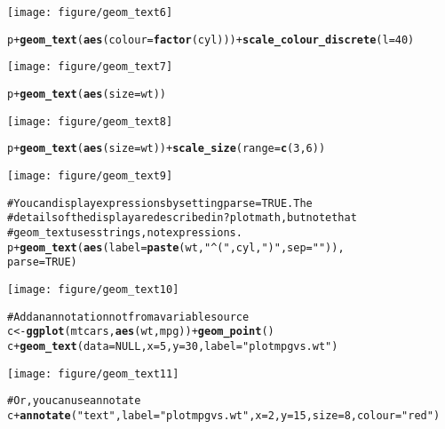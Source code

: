\documentclass[a4paper,titlepage]{tufte-handout}\usepackage{graphicx, color}
\makeatletter
\def\maxwidth{ %
  \ifdim\Gin@nat@width>\linewidth
    \linewidth
  \else
    \Gin@nat@width
  \fi
}
\newcommand{\hlfunctioncall}[1]{\textcolor[rgb]{0.501960784313725,0,0.329411764705882}{\textbf{#1}}}%
\newcommand{\hlstring}[1]{\textcolor[rgb]{0.6,0.6,1}{#1}}%
\newcommand{\hlcomment}[1]{\textcolor[rgb]{0.180392156862745,0.6,0.341176470588235}{#1}}%
\newenvironment{kframe}{%
 \def\at@end@of@kframe{}%
 \ifinner\ifhmode%
  \def\at@end@of@kframe{\end{minipage}}%
  \begin{minipage}{\columnwidth}%
 \fi\fi%
 \def\FrameCommand##1{\hskip\@totalleftmargin \hskip-\fboxsep
 \colorbox{shadecolor}{##1}\hskip-\fboxsep
     \hskip-\linewidth \hskip-\@totalleftmargin \hskip\columnwidth}%
 \MakeFramed {\advance\hsize-\width
   \@totalleftmargin\z@ \linewidth\hsize
   \@setminipage}}%
 {\par\unskip\endMakeFramed%
 \at@end@of@kframe}
\newenvironment{knitrout}{}{} %
\makeatother
\begin{document}
\begin{knitrout}
\begin{kframe}
\end{kframe}\texttt{[image: figure/geom\_text6]} \begin{kframe}\begin{alltt}
p + \hlfunctioncall{geom_text}(\hlfunctioncall{aes}(colour=\hlfunctioncall{factor}(cyl))) + \hlfunctioncall{scale_colour_discrete}(l=40)
\end{alltt}
\end{kframe}\texttt{[image: figure/geom\_text7]} \begin{kframe}\begin{alltt}
p + \hlfunctioncall{geom_text}(\hlfunctioncall{aes}(size=wt))
\end{alltt}
\end{kframe}\texttt{[image: figure/geom\_text8]} \begin{kframe}\begin{alltt}
p + \hlfunctioncall{geom_text}(\hlfunctioncall{aes}(size=wt)) + \hlfunctioncall{scale_size}(range=\hlfunctioncall{c}(3,6))
\end{alltt}
\end{kframe}\texttt{[image: figure/geom\_text9]} \begin{kframe}\begin{alltt}
\hlcomment{# You can display expressions by setting parse = TRUE.  The}
\hlcomment{# details of the display are described in ?plotmath, but note that}
\hlcomment{# geom_text uses strings, not expressions.}
p + \hlfunctioncall{geom_text}(\hlfunctioncall{aes}(label = \hlfunctioncall{paste}(wt, \hlstring{"^("}, cyl, \hlstring{")"}, sep = \hlstring{""})),
  parse = TRUE)
\end{alltt}
\end{kframe}\texttt{[image: figure/geom\_text10]} \begin{kframe}\begin{alltt}
\hlcomment{# Add an annotation not from a variable source}
c <- \hlfunctioncall{ggplot}(mtcars, \hlfunctioncall{aes}(wt, mpg)) + \hlfunctioncall{geom_point}()
c + \hlfunctioncall{geom_text}(data = NULL, x = 5, y = 30, label = \hlstring{"plot mpg vs. wt"})
\end{alltt}
\end{kframe}\texttt{[image: figure/geom\_text11]} \begin{kframe}\begin{alltt}
\hlcomment{# Or, you can use annotate}
c + \hlfunctioncall{annotate}(\hlstring{"text"}, label = \hlstring{"plot mpg vs. wt"}, x = 2, y = 15, size = 8, colour = \hlstring{"red"})

\end{alltt}
\end{kframe}
\end{knitrout}
\end{document}
